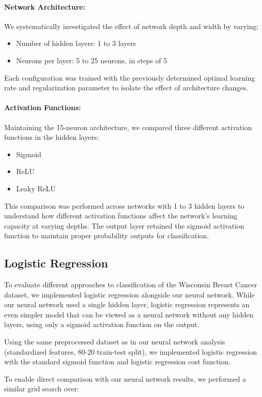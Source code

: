 \paragraph*{Network Architecture:}
We systematically investigated the effect of network depth and width by varying:
\begin{itemize}
    \item Number of hidden layers: 1 to 3 layers
    \item Neurons per layer: 5 to 25 neurons, in steps of 5
\end{itemize}
Each configuration was trained with the previously determined optimal learning rate and regularization parameter to isolate the effect of architecture changes.

\paragraph*{Activation Functions:}
Maintaining the 15-neuron architecture, we compared three different activation functions in the hidden layers:
\begin{itemize}
    \item Sigmoid
    \item ReLU
    \item Leaky ReLU
\end{itemize}
This comparison was performed across networks with 1 to 3 hidden layers to understand how different activation functions affect the network's learning capacity at varying depths. The output layer retained the sigmoid activation function to maintain proper probability outputs for classification.

\subsection{Logistic Regression}
To evaluate different approaches to classification of the Wisconsin Breast Cancer dataset, we implemented logistic regression alongside our neural network. While our neural network used a single hidden layer, logistic regression represents an even simpler model that can be viewed as a neural network without any hidden layers, using only a sigmoid activation function on the output.

Using the same preprocessed dataset as in our neural network analysis (standardized features, 80-20 train-test split), we implemented logistic regression with the standard sigmoid function and logistic regression cost function.

To enable direct comparison with our neural network results, we performed a similar grid search over:

